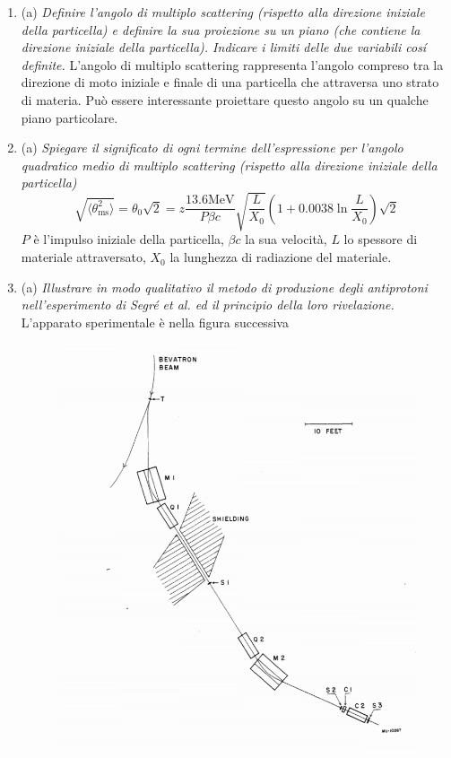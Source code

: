 \documentclass{article}
\renewcommand{\a}{(a)}
\renewcommand{\t}[1]{\textit{ #1}}
\begin{document}
\begin{enumerate}
	\item\a\t{Definire l'angolo di multiplo scattering (rispetto alla direzione iniziale della
		particella) e definire la sua proiezione su un piano (che contiene la direzione
		iniziale della particella). Indicare i limiti delle due variabili cosí definite.}
	L'angolo di multiplo scattering rappresenta l'angolo compreso tra la direzione di moto iniziale e finale di una particella che attraversa uno strato di materia. Può essere interessante proiettare questo angolo su un qualche piano particolare.
	\item\a\t{Spiegare il significato di ogni termine dell'espressione per l’angolo quadratico
		medio di multiplo scattering (rispetto alla direzione iniziale della particella)
		\[\sqrt{\langle\theta^2_{\mathrm{ms}}\rangle}=\theta_0\sqrt{2}= z
		\frac{13.6\mathrm{MeV}}{P\beta c}\sqrt{\frac{L}{X_0}}\left(1+0.0038\ln\frac{L}{X_0}\right)\sqrt{2}\]}
	$P$ è l'impulso iniziale della particella, $\beta c$ la sua velocità, $L$ lo spessore di materiale attraversato, $X_0$ la lunghezza di radiazione del materiale.
	\item\a\t{Illustrare in modo qualitativo il metodo di produzione degli antiprotoni
		nell’esperimento di Segré et al. ed il principio della loro rivelazione.} L'apparato sperimentale è nella figura successiva
	\clearpage
	\begin{figure}[h]
		\centering
		\includegraphics[scale=0.5]{bevatron.png}
	\end{figure}


\end{enumerate}
\end{document}

